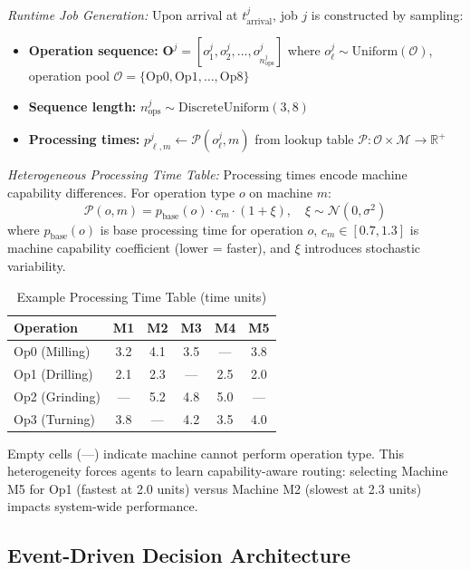\textit{Runtime Job Generation:} Upon arrival at \( t_{\text{arrival}}^j \), job \( j \) is constructed by sampling:
\begin{itemize}
\item \textbf{Operation sequence:} \( \mathbf{O}^j = [o_1^j, o_2^j, \ldots, o_{n_{\text{ops}}^j}^j] \) where \( o_\ell^j \sim \text{Uniform}(\mathcal{O}) \), operation pool \( \mathcal{O} = \{\text{Op0}, \text{Op1}, \ldots, \text{Op8}\} \)
\item \textbf{Sequence length:} \( n_{\text{ops}}^j \sim \text{DiscreteUniform}(3, 8) \)
\item \textbf{Processing times:} \( p_{\ell,m}^j \leftarrow \mathcal{P}(o_\ell^j, m) \) from lookup table \( \mathcal{P}: \mathcal{O} \times \mathcal{M} \rightarrow \mathbb{R}^+ \)
\end{itemize}

\textit{Heterogeneous Processing Time Table:} Processing times encode machine capability differences. For operation type \( o \) on machine \( m \):
\[
\mathcal{P}(o, m) = p_{\text{base}}(o) \cdot c_m \cdot (1 + \xi), \quad \xi \sim \mathcal{N}(0, \sigma^2)
\]
where \( p_{\text{base}}(o) \) is base processing time for operation \( o \), \( c_m \in [0.7, 1.3] \) is machine capability coefficient (lower = faster), and \( \xi \) introduces stochastic variability.

\begin{table}[h]
\centering
\caption{Example Processing Time Table (time units)}
\label{tab:processing_times}
\small
\begin{tabular}{lccccc}
\hline
\textbf{Operation} & \textbf{M1} & \textbf{M2} & \textbf{M3} & \textbf{M4} & \textbf{M5} \\
\hline
Op0 (Milling) & 3.2 & 4.1 & 3.5 & — & 3.8 \\
Op1 (Drilling) & 2.1 & 2.3 & — & 2.5 & 2.0 \\
Op2 (Grinding) & — & 5.2 & 4.8 & 5.0 & — \\
Op3 (Turning) & 3.8 & — & 4.2 & 3.5 & 4.0 \\
\hline
\end{tabular}
\end{table}

Empty cells (—) indicate machine cannot perform operation type. This heterogeneity forces agents to learn capability-aware routing: selecting Machine M5 for Op1 (fastest at 2.0 units) versus Machine M2 (slowest at 2.3 units) impacts system-wide performance.


\subsection{Event-Driven Decision Architecture}
\label{sec:temporal_adaptation}

